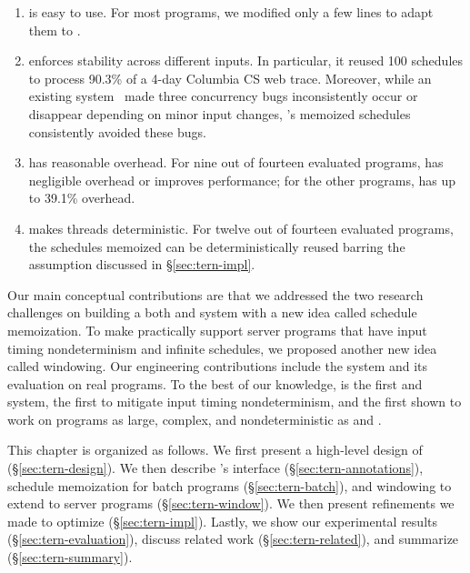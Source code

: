 \begin{enumerate}

\item \tern is easy to use.  For most programs, we modified only a few
  lines to adapt them to \tern.

\item \tern enforces stability across different inputs.  In particular, it
  reused 100 schedules to process 90.3\% of a 4-day Columbia CS web trace.
  Moreover, while an existing \dmt system~\cite{coredet:asplos10} made
  three concurrency bugs inconsistently occur or disappear depending on minor
  input changes, \tern's memoized schedules consistently avoided these bugs.

\item \tern has reasonable overhead.  For nine out of fourteen
  evaluated programs, \tern has negligible overhead or improves
  performance; for the other programs, \tern has up to 39.1\%
  overhead.

\item \tern makes threads deterministic.  For twelve out of fourteen
  evaluated programs, the schedules \tern memoized can be deterministically
  reused barring the assumption discussed in \S\ref{sec:tern-impl}.

\end{enumerate}

Our main conceptual contributions are that we addressed the two research
challenges on building a both \smt and \dmt system with a new idea
called schedule memoization. To make \tern practically support server programs
that have input timing nondeterminism and infinite schedules, we proposed
another new idea called windowing. Our engineering contributions include the
\tern system and its evaluation on real programs.  To the best of our knowledge,
\tern is the first \smt and \dmt system, the first to mitigate input timing
nondeterminism, and the first shown to work on programs as large, complex, and
nondeterministic as \apache and \mysql.

This chapter is organized as follows.  We first present a high-level design of
\tern (\S\ref{sec:tern-design}). We then describe \tern's interface
(\S\ref{sec:tern-annotations}), schedule memoization for batch programs
(\S\ref{sec:tern-batch}), and windowing to extend \tern to server programs
(\S\ref{sec:tern-window}).  We then present refinements we made to optimize
\tern (\S\ref{sec:tern-impl}).  Lastly, we show our experimental results
(\S\ref{sec:tern-evaluation}), discuss related work (\S\ref{sec:tern-related}),
and summarize \tern (\S\ref{sec:tern-summary}).
